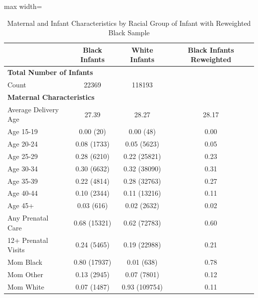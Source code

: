 \begin{table}[ht]
\centering
\small
\caption{Maternal and Infant Characteristics by Racial Group of Infant with Reweighted Black Sample}
\label{tab:balance_reweight}
\begin{adjustbox}{max width=\textwidth}
\begin{tabular}{lccc}
\toprule
& \textbf{Black Infants} & \textbf{White Infants} & \textbf{Black Infants Reweighted} \\
\midrule
\multicolumn{4}{l}{\textbf{Total Number of Infants}} \\
Count & 22369 & 118193 & \\
\midrule
\multicolumn{4}{l}{\textbf{Maternal Characteristics}} \\
\hspace{1em}Average Delivery Age & 27.39 & 28.27 & 28.17 \\
\hspace{1em}Age 15-19 & 0.00 (20) & 0.00 (48) & 0.00 \\
\hspace{1em}Age 20-24 & 0.08 (1733) & 0.05 (5623) & 0.05 \\
\hspace{1em}Age 25-29 & 0.28 (6210) & 0.22 (25821) & 0.23 \\
\hspace{1em}Age 30-34 & 0.30 (6632) & 0.32 (38090) & 0.31 \\
\hspace{1em}Age 35-39 & 0.22 (4814) & 0.28 (32763) & 0.27 \\
\hspace{1em}Age 40-44 & 0.10 (2344) & 0.11 (13216) & 0.11 \\
\hspace{1em}Age 45+ & 0.03 (616) & 0.02 (2632) & 0.02 \\
\hspace{1em}Any Prenatal Care & 0.68 (15321) & 0.62 (72783) & 0.60 \\
\hspace{1em}12+ Prenatal Visits & 0.24 (5465) & 0.19 (22988) & 0.21 \\
\hspace{1em}Mom Black & 0.80 (17937) & 0.01 (638) & 0.78 \\
\hspace{1em}Mom Other & 0.13 (2945) & 0.07 (7801) & 0.12 \\
\hspace{1em}Mom White & 0.07 (1487) & 0.93 (109754) & 0.11 \\

\end{tabular}
\end{adjustbox}
\end{table}
